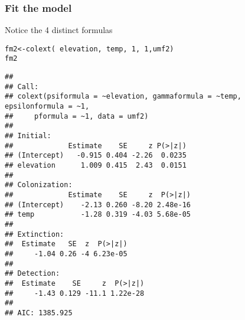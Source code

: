 \documentclass[color=usenames,dvipsnames]{beamer}\usepackage[]{graphicx}\usepackage[]{color}
\makeatletter
\newcommand{\hlnum}[1]{\textcolor[rgb]{0.69,0.494,0}{#1}}%
\newcommand{\hlopt}[1]{\textcolor[rgb]{0,0,0}{#1}}%
\newcommand{\hlstd}[1]{\textcolor[rgb]{0,0,0}{#1}}%
\newcommand{\hlkwb}[1]{\textcolor[rgb]{0,0.341,0.682}{#1}}%
\newcommand{\hlkwd}[1]{\textcolor[rgb]{0.004,0.004,0.506}{#1}}%
\newenvironment{kframe}{%
 \def\at@end@of@kframe{}%
 \ifinner\ifhmode%
  \def\at@end@of@kframe{\end{minipage}}%
  \begin{minipage}{\columnwidth}%
 \fi\fi%
 \def\FrameCommand##1{\hskip\@totalleftmargin \hskip-\fboxsep
 \colorbox{shadecolor}{##1}\hskip-\fboxsep
     \hskip-\linewidth \hskip-\@totalleftmargin \hskip\columnwidth}%
 \MakeFramed {\advance\hsize-\width
   \@totalleftmargin\z@ \linewidth\hsize
   \@setminipage}}%
 {\par\unskip\endMakeFramed%
 \at@end@of@kframe}
\newenvironment{knitrout}{}{} %
\makeatother
\begin{document}
\begin{frame}[fragile]
  \frametitle{Fit the model}
  \footnotesize
  Notice the 4 distinct formulas
\begin{knitrout}\tiny
{}\color{fgcolor}\begin{kframe}
\begin{alltt}
\hlstd{fm2} \hlkwb{<-} \hlkwd{colext}\hlstd{(}\hlopt{~}\hlstd{elevation,}\hlopt{~}\hlstd{temp,}\hlopt{~}\hlnum{1}\hlstd{,}\hlopt{~}\hlnum{1}\hlstd{, umf2)}
\hlstd{fm2}
\end{alltt}
\begin{verbatim}
## 
## Call:
## colext(psiformula = ~elevation, gammaformula = ~temp, epsilonformula = ~1, 
##     pformula = ~1, data = umf2)
## 
## Initial:
##             Estimate    SE     z P(>|z|)
## (Intercept)   -0.915 0.404 -2.26  0.0235
## elevation      1.009 0.415  2.43  0.0151
## 
## Colonization:
##             Estimate    SE     z  P(>|z|)
## (Intercept)    -2.13 0.260 -8.20 2.48e-16
## temp           -1.28 0.319 -4.03 5.68e-05
## 
## Extinction:
##  Estimate   SE  z  P(>|z|)
##     -1.04 0.26 -4 6.23e-05
## 
## Detection:
##  Estimate    SE     z  P(>|z|)
##     -1.43 0.129 -11.1 1.22e-28
## 
## AIC: 1385.925
\end{verbatim}
\end{kframe}
\end{knitrout}
\end{frame}
\end{document}
